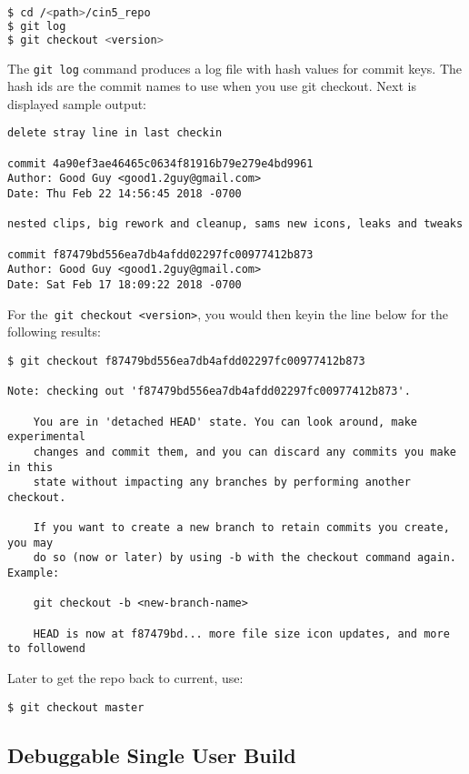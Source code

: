\begin{lstlisting}[language=bash,numbers=none]
$ cd /<path>/cin5_repo
$ git log
$ git checkout <version>
\end{lstlisting}


The \texttt{git log} command produces a log file with hash values for commit keys.  The hash ids are the commit names to use when you use git checkout.  
Next is displayed sample output:


\begin{lstlisting}[numbers=none]
delete stray line in last checkin

commit 4a90ef3ae46465c0634f81916b79e279e4bd9961
Author: Good Guy <good1.2guy@gmail.com>
Date: Thu Feb 22 14:56:45 2018 -0700

nested clips, big rework and cleanup, sams new icons, leaks and tweaks

commit f87479bd556ea7db4afdd02297fc00977412b873
Author: Good Guy <good1.2guy@gmail.com>
Date: Sat Feb 17 18:09:22 2018 -0700
\end{lstlisting}

For the\texttt{ git checkout <version>}, you would then keyin the line below for the following results:

\begin{lstlisting}[numbers=none]
$ git checkout f87479bd556ea7db4afdd02297fc00977412b873

Note: checking out 'f87479bd556ea7db4afdd02297fc00977412b873'.

	You are in 'detached HEAD' state. You can look around, make experimental
	changes and commit them, and you can discard any commits you make in this
	state without impacting any branches by performing another checkout.

	If you want to create a new branch to retain commits you create, you may
	do so (now or later) by using -b with the checkout command again. Example:

  	git checkout -b <new-branch-name>

	HEAD is now at f87479bd... more file size icon updates, and more to followend
\end{lstlisting}

Later to get the repo back to current, use:    
\begin{lstlisting}[numbers=none]
$ git checkout master
\end{lstlisting}


\subsection{Debuggable Single User Build}%
\label{sub:debuggable_single_user_build}


